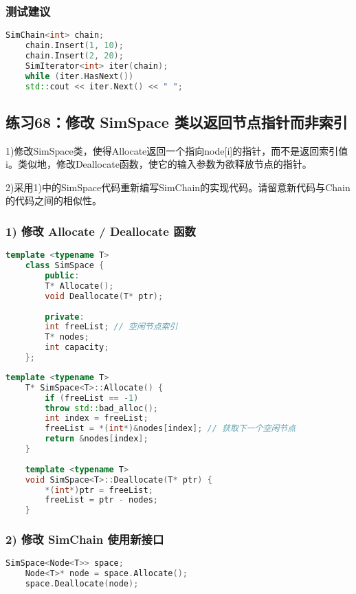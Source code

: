 \documentclass[UTF8]{ctexart}
\begin{document}
\subsubsection*{测试建议}

\begin{lstlisting}[language=C++]
	SimChain<int> chain;
	chain.Insert(1, 10);
	chain.Insert(2, 20);
	SimIterator<int> iter(chain);
	while (iter.HasNext())
	std::cout << iter.Next() << " ";
\end{lstlisting}


\subsection*{练习68：修改 SimSpace 类以返回节点指针而非索引}
1)修改SimSpace类，使得Allocate返回一个指向node[i]的指针，而不是返回索引值i。类似地，修改Deallocate函数，使它的输入参数为欲释放节点的指针。

2)采用1)中的SimSpace代码重新编写SimChain的实现代码。请留意新代码与Chain的代码之间的相似性。

\subsubsection*{1) 修改 Allocate / Deallocate 函数}

\begin{lstlisting}[language=C++]
	template <typename T>
	class SimSpace {
		public:
		T* Allocate();
		void Deallocate(T* ptr);
		
		private:
		int freeList; // 空闲节点索引
		T* nodes;
		int capacity;
	};
\end{lstlisting}

\begin{lstlisting}[language=C++]
	template <typename T>
	T* SimSpace<T>::Allocate() {
		if (freeList == -1)
		throw std::bad_alloc();
		int index = freeList;
		freeList = *(int*)&nodes[index]; // 获取下一个空闲节点
		return &nodes[index];
	}
	
	template <typename T>
	void SimSpace<T>::Deallocate(T* ptr) {
		*(int*)ptr = freeList;
		freeList = ptr - nodes;
	}
\end{lstlisting}

\subsubsection*{2) 修改 SimChain 使用新接口}

\begin{lstlisting}[language=C++]
	SimSpace<Node<T>> space;
	Node<T>* node = space.Allocate();
	space.Deallocate(node);
\end{lstlisting}
\end{document}
